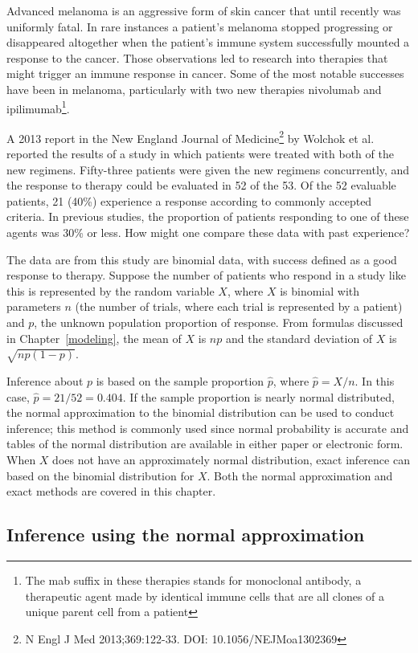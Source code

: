 Advanced melanoma is an aggressive form of skin cancer that until recently was uniformly fatal.  In rare instances a patient's melanoma stopped progressing or disappeared altogether when the patient's immune system successfully mounted a response to the cancer. Those observations led to research into therapies that might trigger an immune response in cancer.  Some of the most notable successes have been in melanoma, particularly with two new therapies nivolumab and ipilimumab\footnote{The mab suffix in these therapies stands for monoclonal antibody, a therapeutic agent made by identical immune cells that are all clones of a unique parent cell from a patient}.

A 2013 report in the New England Journal of Medicine\footnote{N Engl J Med 2013;369:122-33. DOI: 10.1056/NEJMoa1302369} by Wolchok et al. reported the results of a study in which patients were treated with both of the new regimens.  Fifty-three patients were given the new regimens concurrently, and the response to therapy could be evaluated in 52 of the 53.  Of the 52 evaluable patients, 21 (40\%) experience a response according to commonly accepted criteria.  In previous studies, the proportion of patients responding to one of these agents was 30\% or less.  How might one compare these data with past experience?

The data are from this study are binomial data, with success defined as a good response to therapy. Suppose the number of patients who respond in a study like this is represented by the random variable $X$, where $X$ is binomial with parameters $n$ (the number of trials, where each trial is represented by a patient) and $p$, the unknown population proportion of response. From formulas discussed in Chapter~\ref{modeling}, the mean of $X$ is $np$ and the standard deviation of $X$ is $\sqrt{np(1-p)}$.

Inference about $p$ is based on the sample proportion $\hat{p}$, where $\hat{p} = X/n$. In this case, $\hat{p} = 21/52 = 0.404$. If the sample proportion is nearly normal distributed, the normal approximation to the binomial distribution can be used to conduct inference; this method is commonly used since normal probability is accurate and tables of the normal distribution are  available in either paper or electronic form.  When $X$ does not have an approximately normal distribution, exact inference can  based on the binomial distribution for $X$.  Both the normal approximation and exact methods are covered in this chapter.


\subsection{Inference using the normal approximation}


